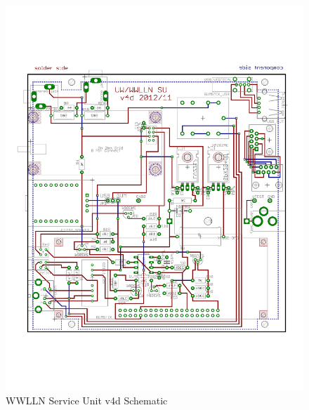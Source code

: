 \begin{figure}[ht!]
   \centering
   \includegraphics[scale=.75]{Appendix/Figures/wwlln_SU_v4.pdf} 
   \caption{WWLLN Service Unit v4d Schematic}
   \label{app:suBoard}
\end{figure}


